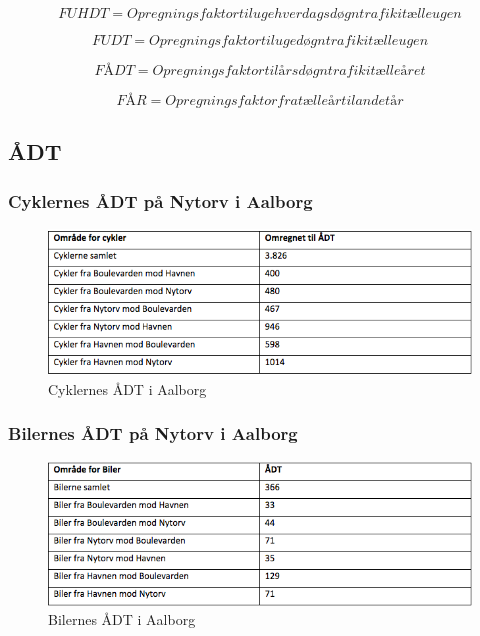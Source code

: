 $$FUHDT = Opregningsfaktor til ugehverdagsdøgntrafik i tælleugen$$

$$FUDT = Opregningsfaktor til ugedøgntrafik i tælleugen$$

$$FÅDT = Opregningsfaktor til årsdøgntrafik i tælleåret$$

$$FÅR = Opregningsfaktor fra tælleår til andet år$$


\subsection{ÅDT}
\label{AEDT}
\subsubsection{Cyklernes ÅDT på Nytorv i Aalborg}
\begin{figure}[htbp]
   \centering
   \begin{adjustbox}{max width=\textwidth}
     \includegraphics[scale=0.8]{figures/Billederogfigur/cykleradt.jpg}
  \end{adjustbox}
   \caption{Cyklernes ÅDT i Aalborg}
   \label{fig:cykleradt}
 \end{figure}

 \subsubsection{Bilernes ÅDT på Nytorv i Aalborg}
 \begin{figure}[htbp]
   \centering
   \begin{adjustbox}{max width=\textwidth}
     \includegraphics[scale=0.6]{figures/Billederogfigur/bileradt.jpg}
  \end{adjustbox}
   \caption{Bilernes ÅDT i Aalborg}
   \label{fig:bileradt}
 \end{figure}

